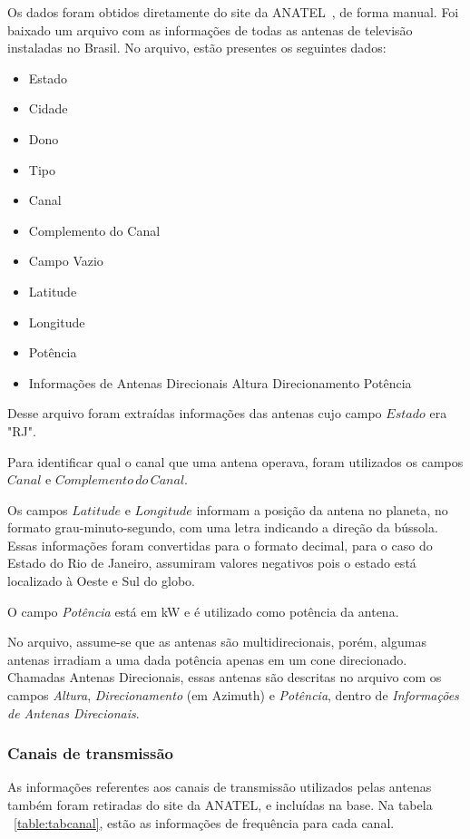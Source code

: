 Os dados foram obtidos diretamente do site da ANATEL~\cite{channelstable}, de forma manual. Foi baixado um arquivo com as informações de todas as antenas de televisão instaladas no Brasil. No arquivo, estão presentes os seguintes dados:

\begin{itemize}
\item Estado
\item Cidade
\item Dono
\item Tipo
\item Canal
\item Complemento do Canal 
\item Campo Vazio
\item Latitude 
\item Longitude 
\item Potência
\item Informações de Antenas Direcionais
	\subitem Altura
	\subitem Direcionamento
	\subitem Potência
\end{itemize}

Desse arquivo foram extraídas informações das antenas cujo campo $Estado$ era "RJ".

Para identificar qual o canal que uma antena operava, foram utilizados os campos $Canal$ e $Complemento\, do\, Canal$.

Os campos $Latitude$ e $Longitude$ informam a posição da antena no planeta, no formato grau-minuto-segundo, com uma letra indicando a direção da bússola. Essas informações foram convertidas para o formato decimal, para o caso do Estado do Rio de Janeiro, assumiram valores negativos pois o estado está localizado à Oeste e Sul do globo.

O campo \textit{Potência} está em kW e é utilizado como potência da antena.

No arquivo, assume-se que as antenas são multidirecionais, porém, algumas antenas irradiam a uma dada potência apenas em um cone direcionado. Chamadas Antenas Direcionais, essas antenas são descritas no arquivo com os campos \textit{Altura}, \textit{Direcionamento} (em Azimuth) e \textit{Potência}, dentro de \textit{Informações de Antenas Direcionais}.

\subsubsection{Canais de transmissão}

As informações referentes aos canais de transmissão utilizados pelas antenas também foram retiradas do site da ANATEL, e incluídas na base. Na tabela ~\ref{table:tabcanal}, estão as informações de frequência para cada canal.

